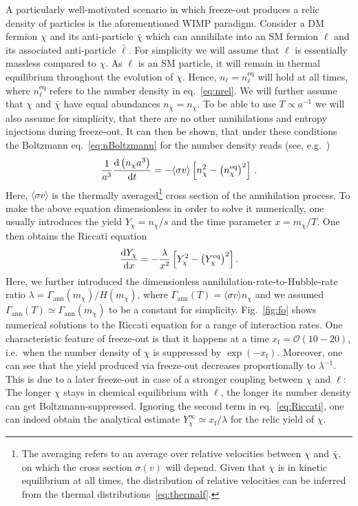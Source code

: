A particularly well-motivated scenario in which freeze-out produces a relic density of particles is the aforementioned \ac{WIMP} paradigm. Consider a \ac{DM} fermion $\chi$ and its anti-particle $\bar{\chi}$ which can annihilate into an \ac{SM} fermion $\ell$ and its associated anti-particle $\bar{\ell}$. For simplicity we will assume that $\ell$ is essentially massless compared to $\chi$. As $\ell$ is an \ac{SM} particle, it will remain in thermal equilibrium throughout the evolution of $\chi$. Hence, $n_\ell = n_\ell^\text{eq}$ will hold at all times, where $n_\ell^\text{eq}$  refers to the number density in eq.~\eqref{eq:nrel}. We will further assume that $\chi$ and $\bar{\chi}$ have equal abundances $n_{\bar{\chi}} = n_\chi$. To be able to use $T \propto a^{-1}$ we will also assume for simplicity, that there are no other annihilations and entropy injections during freeze-out. It can then be shown, that under these conditions the Boltzmann eq.~\eqref{eq:nBoltzmann} for the number density reads (see, e.g.~\cite{Baumann:2022mni, Profumo:2017hqp})
\begin{align}
	\frac{1}{a^3} \frac{\mathrm d \left( n_\chi a^3 \right)}{\mathrm d t} = - \langle \sigma v \rangle \left[ n_\chi^2 - \left( n_\chi^\text{eq} \right)^2 \right] \, .
\end{align}
Here, $\langle \sigma v \rangle$ is the thermally averaged\footnote{The averaging refers to an average over relative velocities between $\chi$ and $\bar{\chi}$, on which the cross section $\sigma(v)$ will depend. Given that $\chi$ is in kinetic equilibrium at all times, the distribution of relative velocities can be inferred from the thermal distributions~\eqref{eq:thermalf}.} cross section of the annihilation process. To make the above equation dimensionless in order to solve it numerically, one usually introduces the yield $Y_\chi = n_\chi / s$ and the time parameter $x = m_\chi / T$. One then obtains the Riccati equation
\begin{align}
	\frac{\mathrm d Y_\chi}{\mathrm d x} = - \frac{\lambda}{x^2} \left[ Y_\chi^2 - \left( Y_\chi^\text{eq} \right)^2 \right] . \label{eq:Riccati}
\end{align}
Here, we further introduced the dimensionless annihilation-rate-to-Hubble-rate ratio $\lambda = \Gamma_\text{ann}(m_\chi) / H(m_\chi)$, where $\Gamma_\text{ann}(T) = \langle \sigma v \rangle n_\chi$ and we assumed $\Gamma_\text{ann}(T) \simeq \Gamma_\text{ann}(m_\chi) $ to be a constant for simplicity. Fig.~\ref{fig:fo} shows numerical solutions to the Riccati equation for a range of interaction rates. One characteristic feature of freeze-out is that it happens at a time $x_\text{f} = \mathcal{O}(10 - 20)$, i.e.~when the number density of $\chi$ is suppressed by $\exp{(-x_\text{f})}$. Moreover, one can see that the yield produced via freeze-out decreases proportionally to $\lambda^{-1}$.  This is due to a later freeze-out in case of a stronger coupling between $\chi$ and $\ell$: The longer $\chi$ stays in chemical equilibrium with $\ell$, the longer its number density can get Boltzmann-suppressed. Ignoring the second term in eq.~\eqref{eq:Riccati}, one can indeed obtain the analytical estimate $Y_\chi^\infty \simeq x_\text{f} / \lambda$ for the relic yield of $\chi$.

